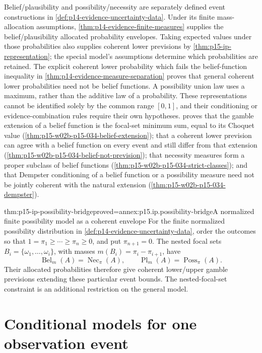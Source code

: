 Belief/plausibility and possibility/necessity are separately defined event
constructions in \cref{def:p14-evidence-uncertainty-data}. Under its finite
mass-allocation assumptions, \cref{thm:p14-evidence-finite-measures}
supplies the belief/plausibility allocated probability envelopes. Taking expected
values under those probabilities also supplies coherent lower previsions
by \cref{thm:p15-ip-representation}; the special model's assumptions
determine which probabilities are retained. The explicit coherent lower
probability which fails the belief-function inequality in
\cref{thm:p14-evidence-measure-separation} proves that general coherent
lower probabilities need not be belief functions. A possibility union law
uses a maximum, rather than the additive law of a probability.
These representations cannot be identified solely by the common range
\([0,1]\), and their conditioning or evidence-combination rules require
their own hypotheses.
 proves that the gamble
extension of a belief function is the focal-set minimum sum, equal to its
Choquet value (\cref{thm:p15-w02b-p15-034-belief-extension}); that a
coherent lower prevision can agree with a belief function on every event
and still differ from that extension
(\cref{thm:p15-w02b-p15-034-belief-not-prevision}); that necessity
measures form a proper subclass of belief functions
(\cref{thm:p15-w02b-p15-034-strict-classes}); and that Dempster
conditioning of a belief function or a possibility measure need not be
jointly coherent with the natural extension
(\cref{thm:p15-w02b-p15-034-dempster}).

\begin{hblemma}{thm:p15-ip-possibility-bridge}{proved=annex:p15.ip.possibility-bridge}{A normalized finite possibility model as a coherent envelope}
For the finite normalized possibility distribution in
\cref{def:p14-evidence-uncertainty-data}, order the outcomes so that
\(1=\pi_1\geq\cdots\geq\pi_n\geq0\), and put
\(\pi_{n+1}=0\). The nested focal sets
\(B_i=\{\omega_1,\ldots,\omega_i\}\), with masses
\(m(B_i)=\pi_i-\pi_{i+1}\), have
\[
 \operatorname{Bel}_m(A)=\operatorname{Nec}_\pi(A),\qquad
 \operatorname{Pl}_m(A)=\operatorname{Poss}_\pi(A).
\]
Their allocated probabilities therefore give coherent lower/upper gamble
previsions extending these particular event bounds. The nested-focal-set
constraint is an additional restriction on the general model.
\end{hblemma}

\section{Conditional models for one observation event}
\label{sec:p15-ip-conditioning}

